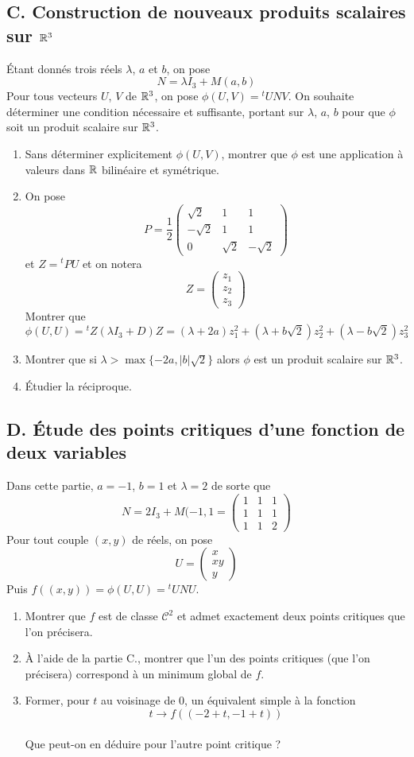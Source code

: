 \subsection*{C. Construction de nouveaux produits scalaires sur $\mathbb{R}^3$}
{\'E}tant donnés trois réels $\lambda$, $a$ et $b$, on pose
\[N=\lambda I_3 +M(a,b)\]
Pour tous vecteurs $U$, $V$ de $\mathbb{R}^3$, on pose $\phi(U,V)={^tU}NV$.\newline
On souhaite déterminer une condition nécessaire et suffisante, portant sur $\lambda$, $a$, $b$ pour que $\phi$ soit un produit scalaire sur $\mathbb{R}^3$.
\begin{enumerate}
\item Sans déterminer explicitement $\phi(U,V)$, montrer que $\phi$ est une application à valeurs dans $\mathbb{R}$ bilinéaire et symétrique.
\item On pose
\[
P=\frac{1}{2}\begin{pmatrix}
\sqrt 2 & 1 & 1\\
-\sqrt 2 & 1 & 1\\
0 & \sqrt 2 & -\sqrt 2
\end{pmatrix}
\]
 et $Z={^tP}U$ et on notera
 \[
 Z=\begin{pmatrix}
 z_1\\
 z_2\\
 z_3
 \end{pmatrix}
 \]
 Montrer que
 \[\phi(U,U)={^t}Z(\lambda I_3 + D)Z=(\lambda+2a)z_1^2+(\lambda+b\sqrt 2)z_2^2+(\lambda-b\sqrt 2)z_3^2\]
 \item Montrer que si $\lambda > \max \{-2a,|b|\sqrt 2\}$ alors $\phi$ est un produit scalaire sur $\mathbb{R}^3$.
 \item {\'E}tudier la réciproque.
\end{enumerate}
\subsection*{D. {\'E}tude des points critiques d'une fonction de deux variables}
Dans cette partie, $a=-1$, $b=1$ et $\lambda=2$ de sorte que
\[N=2I_3+M(-1,1=
\begin{pmatrix}
 1 & 1 & 1\\
 1 & 1 & 1\\
 1 & 1 & 2
 \end{pmatrix}\]
Pour tout couple $(x,y)$ de réels, on pose
 \[
 U=\begin{pmatrix}
 x\\
 xy\\
 y
 \end{pmatrix}
 \]
Puis $f((x,y))=\phi(U,U)={^tU}NU$.
\begin{enumerate}
\item Montrer que $f$ est de classe $\mathcal{C}^2$ et admet exactement deux points critiques que l'on précisera.
\item {\`A} l'aide de la partie C., montrer que l'un des points critiques (que l'on précisera) correspond à un minimum global de $f$.
\item Former, pour $t$ au voisinage de $0$, un équivalent simple à la fonction
\[t \rightarrow f((-2+t,-1+t))\]\\
Que peut-on en déduire pour l'autre point critique ?
\end{enumerate} 
